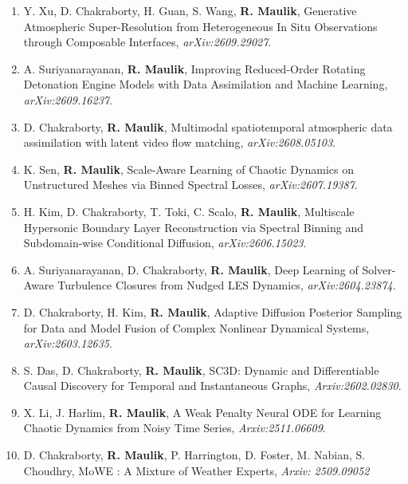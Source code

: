 \documentclass[letterpaper]{article}
\begin{document}
\begin{enumerate}


\item Y. Xu, D. Chakraborty, H. Guan, S. Wang, \textbf{R. Maulik}, Generative Atmospheric Super-Resolution from Heterogeneous In Situ Observations through Composable Interfaces, {\it arXiv:2609.29027}.

\item A. Suriyanarayanan, \textbf{R. Maulik}, Improving Reduced-Order Rotating Detonation Engine Models with Data Assimilation and Machine Learning, {\it arXiv:2609.16237}.

\item D. Chakraborty, \textbf{R. Maulik}, Multimodal spatiotemporal atmospheric data assimilation with latent video flow matching, {\it arXiv:2608.05103}.

\item K. Sen, \textbf{R. Maulik}, Scale-Aware Learning of Chaotic Dynamics on Unstructured Meshes via Binned Spectral Losses, {\it arXiv:2607.19387}.

\item H. Kim, D. Chakraborty, T. Toki, C. Scalo, \textbf{R. Maulik}, Multiscale Hypersonic Boundary Layer Reconstruction via Spectral Binning and Subdomain-wise Conditional Diffusion, {\it arXiv:2606.15023}.

\item A. Suriyanarayanan, D. Chakraborty, \textbf{R. Maulik}, Deep Learning of Solver-Aware Turbulence Closures from Nudged LES Dynamics, {\it arXiv:2604.23874}.

\item D. Chakraborty, H. Kim, \textbf{R. Maulik}, Adaptive Diffusion Posterior Sampling for Data and Model Fusion of Complex Nonlinear Dynamical Systems, {\it arXiv:2603.12635}.

\item S. Das, D. Chakraborty, \textbf{R. Maulik}, SC3D: Dynamic and Differentiable Causal Discovery for Temporal and Instantaneous Graphs, {\it Arxiv:2602.02830}.

\item X. Li, J. Harlim, \textbf{R. Maulik}, A Weak Penalty Neural ODE for Learning Chaotic Dynamics from Noisy Time Series, {\it Arxiv:2511.06609}.

\item D. Chakraborty, \textbf{R. Maulik}, P. Harrington, D. Foster, M. Nabian, S. Choudhry, MoWE : A Mixture of Weather Experts, {\it Arxiv: 2509.09052}


\end{enumerate}
\end{document}
